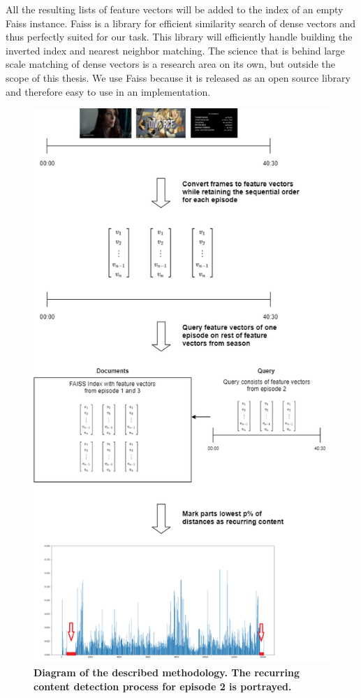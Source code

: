 \documentclass{article}
\begin{document}
All the resulting lists of feature vectors will be added to the index of an empty Faiss instance. Faiss is a library for efficient similarity search of dense vectors \cite{faiss, faiss-github} and thus perfectly suited for our task. This library will efficiently handle building the inverted index and nearest neighbor matching. The science that is behind large scale matching of dense vectors is a research area on its own, but outside the scope of this thesis. We use Faiss because it is released as an open source library and therefore easy to use in an implementation.

\begin{figure}[H]
	\includegraphics[width=\textwidth, center, scale=0.85]{images/thesisdiagram.png}
	\centering
	\caption{\textbf{Diagram of the described methodology. The recurring content detection process for episode 2 is portrayed.}}
	\label{fig:diagram}
\end{figure}
\end{document}
